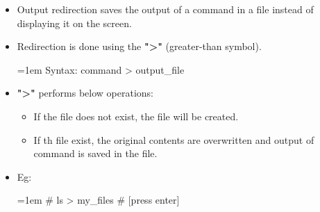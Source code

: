 \setlength{\columnsep}{3pt}
\begin{flushleft}
	\begin{itemize}
		\item Output redirection saves the output of a command in a file instead of displaying it on the screen.
		\item Redirection is done using the \textbf{">"} (greater-than symbol).
		\bigskip
		\begin{tcolorbox}[breakable,notitle,boxrule=-0pt,colback=pink,colframe=pink]
			\color{black}
			\font=1em
			Syntax: command > output\_file
			\font=4pt
		\end{tcolorbox}
		\item \textbf{">"} performs below operations:
		\begin{itemize}
			\item If the file does not exist, the file will be created.
			\item If th file exist, the original contents are overwritten and output of command is saved in the file.
		\end{itemize}
		\item Eg:
		\bigskip
		\begin{tcolorbox}[breakable,notitle,boxrule=-0pt,colback=black,colframe=black]
			\color{green}
			\font=1em
			\# ls > my\_files 			\color{yellow} \# [press enter]
			\font=4pt
		\end{tcolorbox}
		
	\end{itemize}

\end{flushleft}


